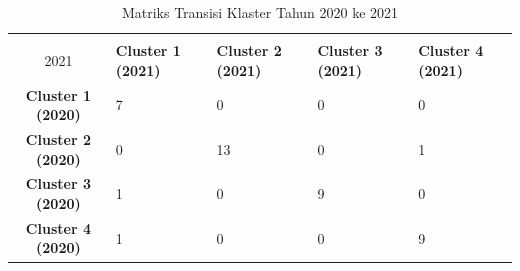 \begin{table}[H]
\centering
\caption{Matriks Transisi Klaster Tahun 2020 ke 2021} \label{tab:transisi_2020_2021}
\begin{tabular}{|c|p{2cm}|p{2cm}|p{2cm}|p{2cm}|}
\hline
\textbf{Tahun 2020 \\ 2021} & \textbf{Cluster 1 (2021)} & \textbf{Cluster 2 (2021)} & \textbf{Cluster 3 (2021)} & \textbf{Cluster 4 (2021)} \\ \hline
\textbf{Cluster 1 (2020)} & 7 & 0 & 0 & 0 \\ \hline
\textbf{Cluster 2 (2020)} & 0 & 13 & 0 & 1 \\ \hline
\textbf{Cluster 3 (2020)} & 1 & 0 & 9 & 0 \\ \hline
\textbf{Cluster 4 (2020)} & 1 & 0 & 0 & 9 \\ \hline
\end{tabular}
\end{table}